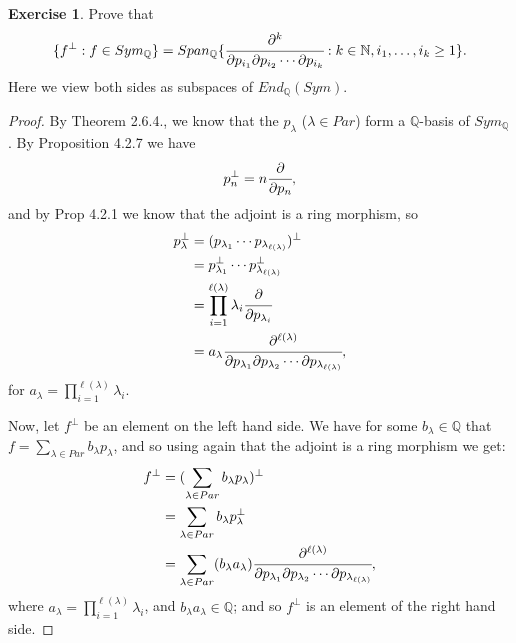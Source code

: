 \documentclass[8pt]{extarticle}
\newcommand{\set}[1]{\{#1\}}
\newcommand{\N}{\mathbb{N}}
\newcommand{\Q}{\mathbb{Q}}
\newcommand{\<}{\langle}
\renewcommand{\>}{\rangle}
\theoremstyle{definition}
\newtheorem{exercise}{Exercise}
\begin{document}
\begin{exercise}
  Prove that
  \begin{align*}
    \set{f^{\perp} : f \in Sym_\Q} = Span_{\Q}\set{\cfrac{\partial^k}{\partial p_{i_1} \partial p_{i_2} \cdots \partial p_{i_k}} : k \in \N, i_1, \dots, i_k \geq 1 }.
  \end{align*}
  Here we view both sides as subspaces of $End_{\Q}(Sym)$.
\end{exercise}

\begin{proof}
  By Theorem 2.6.4., we know that the $p_\lambda$ ($\lambda \in Par$) form a $\Q$-basis of $Sym_\Q$. By Proposition 4.2.7 we have
  \begin{align*}
    p_n^{\perp} = n \cfrac{\partial}{\partial p_n},
  \end{align*}
  and by Prop 4.2.1 we know that the adjoint is a ring morphism, so
  \begin{align*}
    p_{\lambda}^{\perp} &=
    (p_{\lambda_1} \cdots p_{\lambda_{\ell(\lambda)}})^{\perp} \\
    &= p_{\lambda_1}^{\perp} \cdots p_{\lambda_{\ell(\lambda)}}^{\perp} \\
    &= \prod_{i=1}^{\ell(\lambda)} \lambda_i \cfrac{\partial}{\partial p_{\lambda_i}} \\
    &= a_{\lambda} \cfrac{\partial^{\ell(\lambda)}}{\partial p_{\lambda_1}\partial p_{\lambda_2} \cdots \partial p_{\lambda_{\ell(\lambda)}}},
  \end{align*}
  for $a_{\lambda} = \prod\limits_{i=1}^{\ell(\lambda)} \lambda_i$.

  Now, let $f^{\perp}$ be an element on the left hand side. We have for some $b_\lambda \in \Q$ that $f = \sum\limits_{\lambda \in Par} b_{\lambda} p_{\lambda}$, and so using again that the adjoint is a ring morphism we get:
  \begin{align*}
    f^{\perp}
    &=
    (\sum\limits_{\lambda \in Par} b_{\lambda} p_{\lambda})^{\perp}
    \\
    &=
    \sum\limits_{\lambda \in Par} b_{\lambda} p_{\lambda}^{\perp}    \\
    &=
    \sum\limits_{\lambda \in Par} (b_{\lambda} a_{\lambda}) \cfrac{\partial^{\ell(\lambda)}}{\partial p_{\lambda_1}\partial p_{\lambda_2} \cdots \partial p_{\lambda_{\ell(\lambda)}}}, 
  \end{align*}
  where $a_{\lambda} = \prod\limits_{i=1}^{\ell(\lambda)} \lambda_i$, and $b_{\lambda} a_{\lambda} \in \Q$; and so $f^{\perp}$ is an element of the right hand side.
  

\end{proof}
\end{document}
